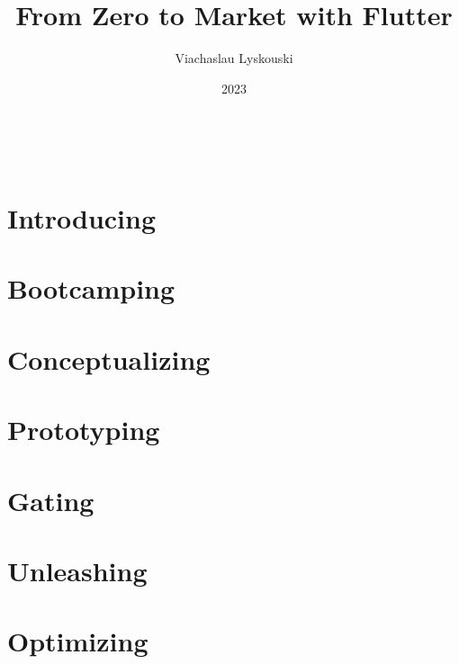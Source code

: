 \documentclass[12pt, a4paper, twoside]{extreport}
\author{Viachaslau Lyskouski}
\title{From Zero to Market with Flutter}
\date{2023}
\begin{document}

\thispagestyle{empty}
~
\newpage



\tableofcontents

\newpage
\section*{Introducing}


\newpage
\section{Bootcamping}



\newpage
\section{Conceptualizing}


\newpage
\section{Prototyping}


\newpage





\newpage
\section{Gating}







\newpage
\section{Unleashing}







\newpage
\section{Optimizing}









\end{document}
